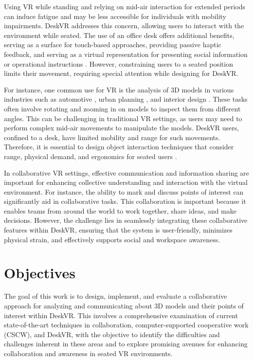 Using VR while standing and relying on mid-air interaction for extended periods can induce fatigue and may be less accessible for individuals with mobility impairments. DeskVR addresses this concern, allowing users to interact with the environment while seated. The use of an office desk offers additional benefits, serving as a surface for touch-based approaches, providing passive haptic feedback, and serving as a virtual representation for presenting social information or operational instructions \cite{zielaskoMenusDeskSystem2019, sousaVRRRRoomVirtualReality2017}. However, constraining users to a seated position limits their movement, requiring special attention while designing for DeskVR.

For instance, one common use for VR is the analysis of 3D models in various industries such as automotive \cite{LAWSON2016323, Zimmermann2008}, urban planning \cite{10.1145/3284389.3284491}, and interior design \cite{10.1145/3605390.3605419}. These tasks often involve rotating and zooming in on models to inspect them from different angles. This can be challenging in traditional VR settings, as users may need to perform complex mid-air movements to manipulate the models. DeskVR users, confined to a desk, have limited mobility and range for such movements. Therefore, it is essential to design object interaction techniques that consider range, physical demand, and ergonomics for seated users \cite{almeidaSIT6IndirectTouchbased2023}.

In collaborative VR settings, effective communication and information sharing are important for enhancing collective understanding and interaction with the virtual environment. For instance, the ability to mark and discuss points of interest can significantly aid in collaborative tasks. This collaboration is important because it enables teams from around the world to work together, share ideas, and make decisions. However, the challenge lies in seamlessly integrating these collaborative features within DeskVR, ensuring that the system is user-friendly, minimizes physical strain, and effectively supports social and workspace awareness.

\section{Objectives}

The goal of this work is to design, implement, and evaluate a collaborative approach for analyzing and communicating about 3D models and their points of interest within DeskVR. This involves a comprehensive examination of current state-of-the-art techniques in collaboration, computer-supported cooperative work (CSCW), and DeskVR, with the objective to identify the difficulties and challenges inherent in these areas and to explore promising avenues for enhancing collaboration and awareness in seated VR environments.

